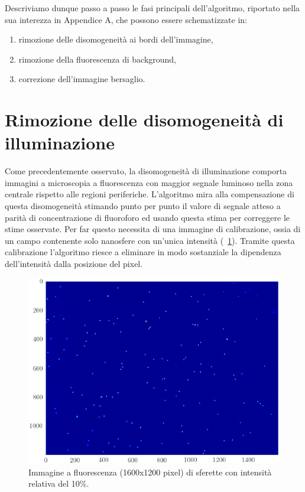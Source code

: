 Descriviamo dunque passo a passo le fasi principali dell'algoritmo, riportato nella sua interezza in Appendice A, che possono essere schematizzate in:
\begin{enumerate}
 \item rimozione delle disomogeneità ai bordi dell'immagine,
 \item rimozione della fluorescenza di background,
 \item correzione dell'immagine bersaglio.
\end{enumerate}


\section{Rimozione delle disomogeneità di illuminazione}

Come precedentemente osservato, la disomogeneità di illuminazione comporta immagini a microscopia a fluorescenza con maggior segnale luminoso nella zona centrale rispetto alle regioni periferiche.
L'algoritmo mira alla compensazione di questa disomogeneità stimando punto per punto il valore di segnale atteso a parità di concentrazione di fluoroforo ed usando questa stima per correggere le stime osservate.
Per far questo necessita di una immagine di calibrazione, ossia di un campo contenente solo nanosfere con un'unica intensità (\figurename~\ref{fig:unaint}).
Tramite questa calibrazione l'algoritmo riesce a eliminare in modo sostanziale la dipendenza dell'intensità dalla posizione del pixel. 

\begin{figure}[p]
 \centering
 \includegraphics[scale=.64]{img/CAP3unaint.png}
 \caption{\small{Immagine a fluorescenza (1600x1200 pixel) di sferette con intensità relativa del 10\%.}}
 \label{fig:unaint}
\end{figure}

